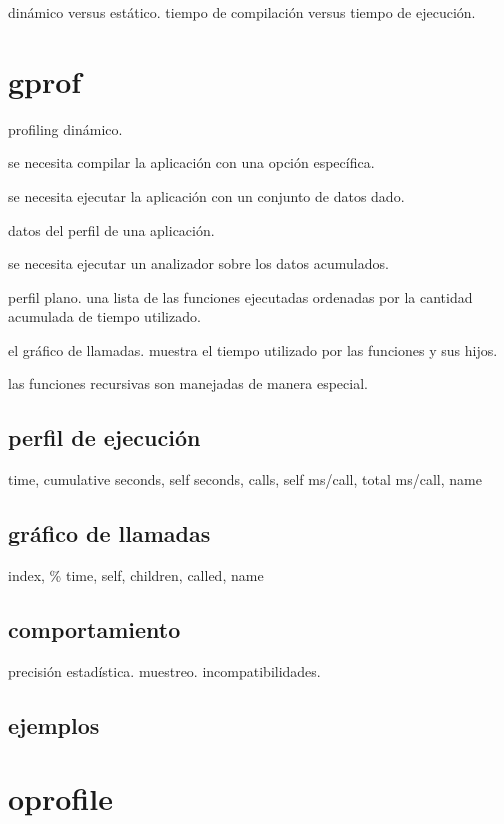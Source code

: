 \documentclass[a4paper]{report}
\begin{document}
din\'amico versus est\'atico.
tiempo de compilaci\'on versus tiempo de ejecuci\'on.

\section{gprof}

profiling din\'amico.

se necesita compilar la aplicaci\'on con una opci\'on espec\'ifica.

se necesita ejecutar la aplicaci\'on con un conjunto de datos dado.

datos del perfil de una aplicaci\'on.

se necesita ejecutar un analizador sobre los datos acumulados.

perfil plano. una lista de las funciones ejecutadas ordenadas por la cantidad
acumulada de tiempo utilizado.

el gr\'afico de llamadas. muestra el tiempo utilizado por las funciones y sus hijos.

las funciones recursivas son manejadas de manera especial.

\subsection{perfil de ejecuci\'on}

time, cumulative seconds, self seconds, calls, self ms/call, total ms/call, name

\subsection{gr\'afico de llamadas}

index, \% time, self, children, called, name

\subsection{comportamiento}

precisi\'on estad\'istica. muestreo. incompatibilidades.

\subsection{ejemplos}

\section{oprofile}
\end{document}
